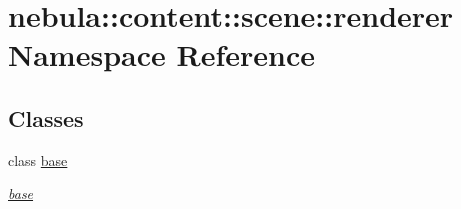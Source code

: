 \hypertarget{namespacenebula_1_1content_1_1scene_1_1renderer}{
\section{nebula::content::scene::renderer Namespace Reference}
\label{namespacenebula_1_1content_1_1scene_1_1renderer}
}
\subsection*{Classes}
\begin{DoxyCompactItemize}
\item 
class \hyperlink{classnebula_1_1content_1_1scene_1_1renderer_1_1base}{base}
\begin{DoxyCompactList}\small\item\em \hyperlink{classnebula_1_1content_1_1scene_1_1renderer_1_1base}{base} \item\end{DoxyCompactList}\end{DoxyCompactItemize}
